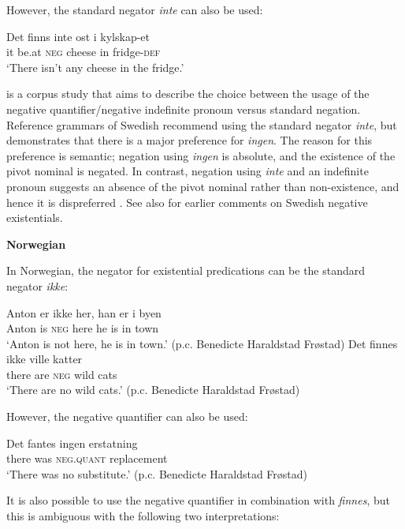 \documentclass[output=paper]{langsci/langscibook}
\begin{document}
\begin{unindented}
However, the standard negator \textit{inte} can also be used:
%
\begin{exe}\ex \gll Det finns inte ost i  kylskap-et \\
it be.at \textsc{neg} cheese in fridge-\textsc{def} \\
\glt `There isn't any cheese in the fridge.' \citep[115]{Veselinova2013}
    \end{exe}

\citet{Bordal2017} is a corpus study that aims to describe the choice
between the usage of the negative quantifier\slash negative indefinite
pronoun versus standard negation. Reference grammars of Swedish recommend
using the standard negator \textit{inte}, but \textcite[15ff]{Bordal2017} demonstrates that there is a major preference for \textit{ingen}. The reason for this preference is semantic; negation using \textit{ingen} is absolute, and the existence of the pivot nominal is negated. In contrast, negation using \textit{inte} and an indefinite pronoun suggests an absence of the pivot nominal rather than non-existence, and hence it is dispreferred \citep[21--22]{Bordal2017}. See also \citet[114--115]{Veselinova2013} for earlier comments on Swedish negative existentials.

\textbf{Norwegian}

In Norwegian, the negator for existential predications can be the standard negator \textit{ikke}:
%
\begin{exe}\ex \gll Anton er ikke her, han er i byen  \\
Anton is \textsc{neg} here he is in town \\
    \glt `Anton is not here, he is in town.' (p.c. Benedicte Haraldstad Frøstad)
\ex \gll Det finnes ikke ville  katter \\
there are \textsc{neg} wild cats \\
    \glt `There are no wild cats.' (p.c. Benedicte Haraldstad Frøstad)
    \end{exe}

However, the negative quantifier can also be used:
%
\begin{exe}\ex \gll Det fantes ingen   erstatning \\
there was    \textsc{neg.quant}  replacement \\
    \glt `There was no substitute.' (p.c. Benedicte Haraldstad Frøstad)
    \end{exe}

It is also possible to use the negative quantifier in combination with \textit{finnes}, but this is ambiguous with the following two interpretations:


\end{unindented}
\end{document}
